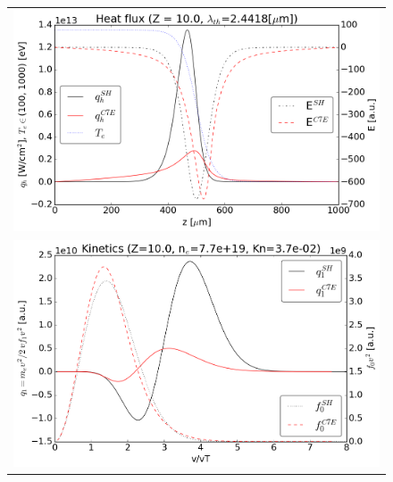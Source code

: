 \documentclass[preprint,12pt]{elsarticle}
\begin{document}
\begin{figure}[tbh]
  \begin{center}
    \begin{tabular}{c}
      \includegraphics[width=1.0\textwidth]{../results/fe_analysis/C7E/P5_heatflux_Z10_fifthF.png} \\ 
      \includegraphics[width=1.0\textwidth]{../results/fe_analysis/C7E/P5_kinetics_Z10_fifthF.png}
    \end{tabular}
  \caption{
  }
  \end{center}
  \label{fig:AWBScorrection_f1}
\end{figure}
\end{document}

